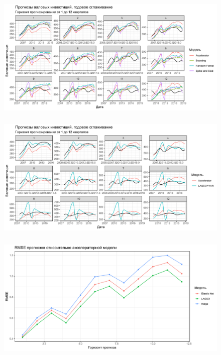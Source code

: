 \documentclass[c, dvipsnames]{beamer}  %
\begin{document}
 \begin{frame}
\frametitle{\insertsection} 
\framesubtitle{\insertsubsection}
\begin{figure}
\includegraphics[width=\linewidth]{smooth3.pdf}
\end{figure}
\end{frame} 

 \begin{frame}
\frametitle{\insertsection} 
\framesubtitle{\insertsubsection}
\begin{figure}
\includegraphics[width=\linewidth]{smooth4.pdf}
\end{figure}
\end{frame} 


 \begin{frame}
\frametitle{\insertsection} 
\framesubtitle{\insertsubsection}
\begin{figure}
\includegraphics[width=\linewidth]{rmse1.pdf}
\end{figure}
\end{frame} 
\end{document}

